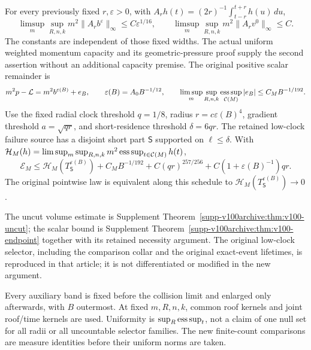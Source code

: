 \begin{inputstatement}
\label{input:v102-analytic}
For every previously fixed $r,\varepsilon>0$, with
$A_rh(t)=(2r)^{-1}\int_{t-r}^{t+r}h(u)\,du$,
\begin{equation}\label{eq:v102-volume-input}
 \limsup_m\sup_{R,n,k}m^2\|A_rb^\varepsilon\|_\infty
       \le C\varepsilon^{1/16},\qquad
 \limsup_m\sup_{R,n,k}m^2\|A_rv^0\|_\infty\le C.
\end{equation}
The constants are independent of those fixed widths. The actual
uniform weighted momentum capacity and its geometric-pressure proof
supply the second assertion without an additional capacity premise.
The original positive scalar remainder is
\[
 m^2p-\mathcal L=m^2b^{\varepsilon(B)}+e_B,
 \qquad\varepsilon(B)=A_0B^{-1/12},\qquad
 \limsup_m\sup_{R,n,k}\operatorname*{ess\,sup}_{\mathcal C(M)}|e_B|
                                      \le C_MB^{-1/192}.
\]
Use the fixed radial clock threshold $q=1/8$, radius
$r=c\varepsilon(B)^4$, gradient threshold $a=\sqrt{qr}$, and
short-residence threshold $\delta=6qr$. The retained low-clock
failure source has a disjoint short part $\mathsf S$ supported on
$\ell\le\delta$. With
$\mathcal H_M(h)=\limsup_m\sup_{R,n,k}m^2
\operatorname*{ess\,sup}_{t\in\mathcal C(M)}h(t)$,
\begin{equation}\label{eq:v102-scalar-input}
 \mathcal E_M\le\mathcal H_M(T_{\mathsf S}^{\varepsilon(B)})
       +C_MB^{-1/192}+C(qr)^{257/256}
                           +C(1+\varepsilon(B)^{-1})qr.
\end{equation}
The original pointwise law is equivalent along this schedule to
$\mathcal H_M(T_{\mathsf S}^{\varepsilon(B)})\to0$.
\end{inputstatement}
The uncut volume estimate is Supplement
Theorem~\ref{supp-v100archive:thm:v100-uncut}; the scalar bound is
Supplement Theorem~\ref{supp-v100archive:thm:v100-endpoint} together
with its retained necessity argument. The original low-clock selector,
including the comparison collar and the original exact-event
lifetimes, is reproduced in that article; it is not differentiated or
modified in the new argument.

Every auxiliary band is fixed before the collision limit and enlarged
only afterwards, with $B$ outermost. At fixed $m,R,n,k$, common roof
kernels and joint roof/time kernels are used. Uniformity is
$\sup_R\operatorname*{ess\,sup}_t$, not a claim of one null set for all radii or all
uncountable selector families. The new finite-count comparisons are
measure identities before their uniform norms are taken.

